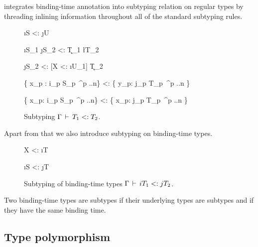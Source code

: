 \calculus integrates binding-time annotation into subtyping relation on regular types by
threading inlining information throughout all of the standard subtyping rules.

\begin{figure}[H]


  {\Gamma \ts \i{S} <: \j{U}}

  {\Gamma \ts \i{S_1} \ra \j{S_2} <: \k{T_1} \ra \l{T_2}}

  {\Gamma \ts [X <: \i{U_1}] \ra \j{S_2} <: [X <: \i{U_1}] \ra \k{T_2}}

  {\Gamma \ts \{ x_p : i_p S_p\ ^{p ..n}\} <: \{ y_p: j_p T_p\ ^{p ..n} \} }

  {\Gamma \ts \{ x_p: i_p S_p\ ^{p ..n}\} <: \{ x_p: j_p T_p\ ^{p ..n} \}}

\caption{Subtyping $\Gamma \,\vdash\, T_1 <: T_2$.}
\end{figure}

Apart from that we also introduce subtyping on binding-time types.

\begin{figure}[H]
  {\Gamma \ts X <: \i{T}}

  {\Gamma \ts \i{S} <: \j{T}}
\caption{Subtyping of binding-time types $\Gamma \,\vdash\, i T_1 <: j T_2$.}
\end{figure}

Two binding-time types are subtypes if their underlying types are
subtypes and if they have the same binding time.

\subsection{Type polymorphism}

